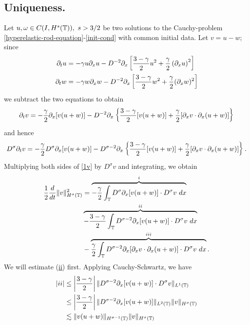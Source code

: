 	\subsection{Uniqueness.}
	Let $u,\omega \in C(I, H^s(\mathbb{T})), \ s > 3/2$ be two solutions to the
	Cauchy-problem \eqref{hyperelastic-rod-equation}-\eqref{init-cond} with
	common initial data. Let $v=u-w$; since
	\begin{align*}
		\partial_t u 
		& = - \gamma u \partial_x u - D^{-2} \partial_x \left[ \frac{3-\gamma}{2} u^2 +
		\frac{\gamma}{2}\left( \partial_x u \right)^2 \right]
		\\
		\partial_t w & = -\gamma w \partial_x w - D^{-2} \partial_x \left[
		\frac{3-\gamma}{2} w^2 + \frac{\gamma}{2}(\partial_x w)^2 
		\right]
	\end{align*}
	we subtract the two equations to obtain 
	\begin{equation*}
		\begin{split}
			\partial_t v
			= -\frac{\gamma}{2} \partial_x [v(u + w)] - D^{-2} \partial_x \left\{
			\frac{3-\gamma}{2}[v(u+w)] + \frac{\gamma}{2}[\partial_x v \cdot \partial_x (u+w)]
			\right\}
		\end{split}
	\end{equation*}
	and hence
	\begin{equation}
		\begin{split}
			D^\sigma \partial_t v = -\frac{\gamma}{2} D^\sigma \partial_x [v(u+w)] - D^{\sigma -2} \partial_x
			\left\{ \frac{3-\gamma}{2} [v(u+w)] + \frac{\gamma}{2} [\partial_x v
			\cdot \partial_x
			(u+w)]
			\right\}.
			\label{1v}
		\end{split}
	\end{equation}
	Multiplying both sides of \eqref{1v} by $D^\sigma v$ and integrating, we obtain
	\begin{equation}
		\begin{split}
			\frac{1}{2} \frac{d}{dt} \|v\|_{H^\sigma(\mathbb{T})}^2
			& =  \overbrace{-\frac{\gamma}{2} \int_{\mathbb{T}} D^\sigma \partial_x [v(u+w)] \cdot
			D^\sigma v \ dx}^i
			\\
			& \overbrace{- \frac{3-\gamma}{2} \int_{\mathbb{T}}  D^{\sigma -2}
			\partial_x[v(u+w)] \cdot
			D^\sigma v \ dx}^{ii} 
			\\
			& - \overbrace{\frac{\gamma}{2} \int_{\mathbb{T}} D^{\sigma -2} \partial_x [ \partial_x v
			\cdot \partial_x (u+w)]\cdot D^\sigma v \ dx }^{iii}.
			\label{2v}
		\end{split}
	\end{equation}
	We will estimate (\hyperref[2v]{ii}) first.
	Applying Cauchy-Schwartz, we have 
	\begin{equation*}
		\begin{split}
			|ii|
			& \le \left | \frac{3-\gamma}{2} \right | \|D^{\sigma -2}
			\partial_x [v(u+w)] \cdot D^\sigma
			v  \|_{L^1(\mathbb{T})}
			\\
			 & \le  \left | \frac{3-\gamma}{2} \right | \|D^{\sigma -2} \partial_x [v(u+w)]
			\|_{L^2(\mathbb{T})} \|v\|_{H^\sigma(\mathbb{T})}
			\\
			& \lesssim \|v(u+w)\|_{H^{\sigma -1}(\mathbb{T})} \|v\|_{H^\sigma(\mathbb{T})}
		\end{split}
	\end{equation*}
